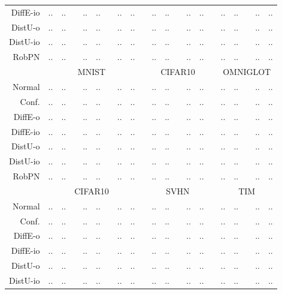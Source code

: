 \begin{table*}
\begin{tiny}
\begin{tabular}{@{}rrrcrrcrrcrrcrrcrrcrr@{}}
			DiffE-io   & .. & .. & & .. & .. & & .. & .. & & .. & .. & & .. & .. & & .. & .. & & .. & .. \\
			DistU-o    & .. & .. & & .. & .. & & .. & .. & & .. & .. & & .. & .. & & .. & .. & & .. & .. \\
			DistU-io   & .. & .. & & .. & .. & & .. & .. & & .. & .. & & .. & .. & & .. & .. & & .. & .. \\
			RobPN      & .. & .. & & .. & .. & & .. & .. & & .. & .. & & .. & .. & & .. & .. & & .. & .. \\
			\midrule
			& \multicolumn{8}{c}{MNIST} & & \multicolumn{5}{c}{CIFAR10} & & \multicolumn{5}{c}{OMNIGLOT} \\
			Normal     & .. & .. & & .. & .. & & .. & .. & & .. & .. & & .. & .. & & .. & .. & & .. & .. \\
			Conf.      & .. & .. & & .. & .. & & .. & .. & & .. & .. & & .. & .. & & .. & .. & & .. & .. \\
			DiffE-o    & .. & .. & & .. & .. & & .. & .. & & .. & .. & & .. & .. & & .. & .. & & .. & .. \\
			DiffE-io   & .. & .. & & .. & .. & & .. & .. & & .. & .. & & .. & .. & & .. & .. & & .. & .. \\
			DistU-o    & .. & .. & & .. & .. & & .. & .. & & .. & .. & & .. & .. & & .. & .. & & .. & .. \\
			DistU-io   & .. & .. & & .. & .. & & .. & .. & & .. & .. & & .. & .. & & .. & .. & & .. & .. \\
			RobPN      & .. & .. & & .. & .. & & .. & .. & & .. & .. & & .. & .. & & .. & .. & & .. & .. \\
			\midrule
			& \multicolumn{8}{c}{CIFAR10} & & \multicolumn{5}{c}{SVHN} & & \multicolumn{5}{c}{TIM} \\
			Normal     & .. & .. & & .. & .. & & .. & .. & & .. & .. & & .. & .. & & .. & .. & & .. & .. \\
			Conf.      & .. & .. & & .. & .. & & .. & .. & & .. & .. & & .. & .. & & .. & .. & & .. & .. \\
			DiffE-o    & .. & .. & & .. & .. & & .. & .. & & .. & .. & & .. & .. & & .. & .. & & .. & .. \\
			DiffE-io   & .. & .. & & .. & .. & & .. & .. & & .. & .. & & .. & .. & & .. & .. & & .. & .. \\
			DistU-o    & .. & .. & & .. & .. & & .. & .. & & .. & .. & & .. & .. & & .. & .. & & .. & .. \\
			DistU-io   & .. & .. & & .. & .. & & .. & .. & & .. & .. & & .. & .. & & .. & .. & & .. & .. \\

\end{tabular}
\end{tiny}
\end{table*}
